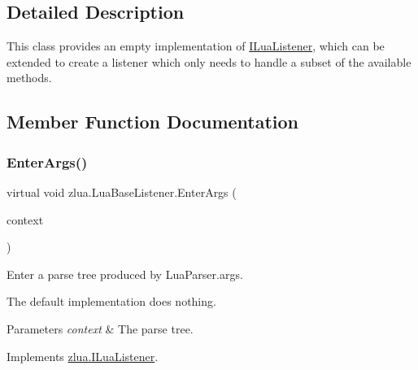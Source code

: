 \subsection{Detailed Description}
This class provides an empty implementation of \mbox{\hyperlink{interfacezlua_1_1_i_lua_listener}{I\+Lua\+Listener}}, which can be extended to create a listener which only needs to handle a subset of the available methods. 



\subsection{Member Function Documentation}
\mbox{\label{classzlua_1_1_lua_base_listener_a86f29737c93fb7e2b6026209916ca3ff}} 
\subsubsection{\texorpdfstring{Enter\+Args()}{EnterArgs()}}
{\footnotesize\ttfamily virtual void zlua.\+Lua\+Base\+Listener.\+Enter\+Args (\begin{DoxyParamCaption}\item[{\mbox{[}\+Not\+Null\mbox{]} \mbox{\hyperlink{classzlua_1_1_lua_parser_1_1_args_context}{Lua\+Parser.\+Args\+Context}}}]{context }\end{DoxyParamCaption})\hspace{0.3cm}{\ttfamily [virtual]}}



Enter a parse tree produced by Lua\+Parser.\+args. 

The default implementation does nothing.


\begin{DoxyParams}{Parameters}
{\em context} & The parse tree.\\
\hline
\end{DoxyParams}


Implements \mbox{\hyperlink{interfacezlua_1_1_i_lua_listener_a77a4130828fbc6f3827ea87c567e84ac}{zlua.\+I\+Lua\+Listener}}.

\mbox{\label{classzlua_1_1_lua_base_listener_aec93807e61e1511e344e419191e80d43}} 
